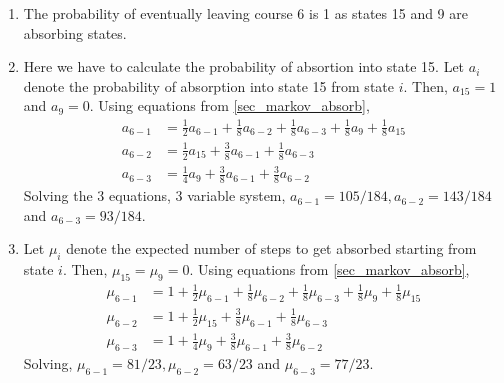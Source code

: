 \documentclass[../../probability-notes.tex]{subfiles}
\begin{document}
        \begin{enumerate}
            \item The probability of eventually leaving course 6 is 1 as states 15 and 9 are absorbing states.
            \item \label{itm:a_markovcourse_2} Here we have to calculate the probability of absortion into state 15. Let $a_{i}$ denote the probability of absorption into state 15 from state $i$. Then, $a_{15} = 1$ and $a_{9} = 0$. Using equations from \ref{sec_markov_absorb},
            \begin{align*}
                a_{6-1} &= \frac{1}{2}a_{6-1} + \frac{1}{8} a_{6-2} + \frac{1}{8} a_{6-3} + \frac{1}{8}a_{9} + \frac{1}{8}a_{15}\\
                a_{6-2} &= \frac{1}{2}a_{15} + \frac{3}{8}a_{6-1} + \frac{1}{8}a_{6-3}\\
                a_{6-3} &= \frac{1}{4}a_{9} + \frac{3}{8}a_{6-1} + \frac{3}{8}a_{6-2}
            \end{align*}
            Solving the 3 equations, 3 variable system, $a_{6-1} = 105/184, a_{6-2} = 143/184$ and $a_{6-3} = 93/184$.
            \item Let $\mu_{i}$ denote the expected number of steps to get absorbed starting from state $i$. Then, $\mu_{15} = \mu_{9} = 0$. Using equations from \ref{sec_markov_absorb},
            \begin{align*}
                \mu_{6-1} &= 1 + \frac{1}{2}\mu_{6-1} + \frac{1}{8} \mu_{6-2} + \frac{1}{8} \mu_{6-3} + \frac{1}{8}\mu_{9} + \frac{1}{8}\mu_{15}\\
                \mu_{6-2} &= 1 + \frac{1}{2}\mu_{15} + \frac{3}{8}\mu_{6-1} + \frac{1}{8}\mu_{6-3}\\
                \mu_{6-3} &= 1 + \frac{1}{4}\mu_{9} + \frac{3}{8}\mu_{6-1} + \frac{3}{8}\mu_{6-2}                
            \end{align*}
            Solving, $\mu_{6-1} = 81/23, \mu_{6-2} = 63/23$ and $\mu_{6-3} = 77/23$.


\end{enumerate}
\end{document}
